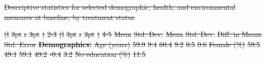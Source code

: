 \documentclass[
  letterpaper,
  DIV=11,
  numbers=noendperiod]{scrartcl}
\makeatletter
\renewenvironment{table}%
   {\renewcommand\familydefault\sfdefault
    \@float{table}}
   {\end@float}
\providecommand{\DIFdel}[1]{{\protect\color{red}\sout{#1}}}                      %
\providecommand{\DIFdelbegin}{} %
\providecommand{\DIFdelend}{} %
\providecommand{\DIFdelFL}[1]{\DIFdel{#1}} %
\providecommand{\DIFdelbeginFL}{} %
\providecommand{\DIFdelendFL}{} %
\newcommand{\DIFscaledelfig}{0.5}
\newlength{\DIFdelgraphicswidth} %
\newlength{\DIFdelgraphicsheight} %
\newcommand{\DIFdelincludegraphics}[2][]{%
\sbox{\DIFdelgraphicsbox}{\DIFOincludegraphics[#1]{#2}}%
\settoboxwidth{\DIFdelgraphicswidth}{\DIFdelgraphicsbox} %
\settoboxtotalheight{\DIFdelgraphicsheight}{\DIFdelgraphicsbox} %
\scalebox{\DIFscaledelfig}{%
\parbox[b]{\DIFdelgraphicswidth}{\usebox{\DIFdelgraphicsbox}\\[-\baselineskip] \rule{\DIFdelgraphicswidth}{0em}}\llap{\resizebox{\DIFdelgraphicswidth}{\DIFdelgraphicsheight}{%
\setlength{\unitlength}{\DIFdelgraphicswidth}%
\begin{picture}(1,1)%
\thicklines\linethickness{2pt} %
{\color[rgb]{1,0,0}\put(0,0){\framebox(1,1){}}}%
{\color[rgb]{1,0,0}\put(0,0){\line( 1,1){1}}}%
{\color[rgb]{1,0,0}\put(0,1){\line(1,-1){1}}}%
\end{picture}%
}\hspace*{3pt}}} %
} %
\DeclareRobustCommand{\DIFdelbegin}{\DIFOdelbegin \let\includegraphics\DIFdelincludegraphics} %
\DeclareRobustCommand{\DIFdelend}{\DIFOaddend \let\includegraphics\DIFOincludegraphics} %
\DeclareRobustCommand{\DIFdelbeginFL}{\DIFOdelbeginFL \let\includegraphics\DIFdelincludegraphics} %
\DeclareRobustCommand{\DIFdelendFL}{\DIFOaddendFL \let\includegraphics\DIFOincludegraphics} %
\makeatother
\begin{document}
\DIFdelbegin %
\DIFdelend \begin{table}
\DIFdelbeginFL %
{%
\DIFdelFL{Descriptive statistics for selected demographic, health, and
environmental measures at baseline, by treatment status }}%
\DIFdelendFL 

\DIFdelbeginFL %
\DIFdelFL{(l}%
\DIFdelFL{3pt}%
\DIFdelFL{r}%
\DIFdelFL{3pt}%
\DIFdelFL{)}%
\DIFdelFL{2-3}%
\DIFdelFL{(l}%
\DIFdelFL{3pt}%
\DIFdelFL{r}%
\DIFdelFL{3pt}%
\DIFdelFL{)}%
\DIFdelFL{4-5}%
\DIFdelFL{Mean }%
\DIFdelFL{Std. Dev. }%
\DIFdelFL{Mean }%
\DIFdelFL{Std. Dev. }%
\DIFdelFL{Diff. in Means }%
\DIFdelFL{Std. Error}%
\textbf{\DIFdelFL{Demographics:}} %
\textbf{} %
\textbf{} %
\textbf{} %
\textbf{} %
\textbf{} %
\textbf{}%
\DIFdelFL{Age (years) }%
\DIFdelFL{59.9 }%
\DIFdelFL{9.4 }%
\DIFdelFL{60.4 }%
\DIFdelFL{9.2 }%
\DIFdelFL{0.5 }%
\DIFdelFL{0.6}%
\DIFdelFL{Female (\%) }%
\DIFdelFL{59.5 }%
\DIFdelFL{49.1 }%
\DIFdelFL{59.1 }%
\DIFdelFL{49.2 }%
\DIFdelFL{-0.4 }%
\DIFdelFL{3.2}%
\DIFdelFL{No education (\%) }%
\DIFdelFL{11.5 }%

\end{table}
\end{document}

